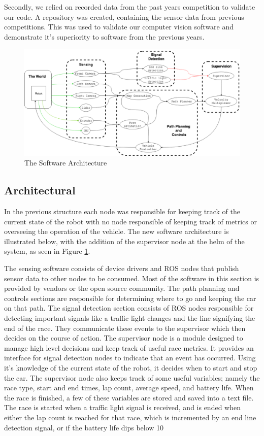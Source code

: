 \documentclass[11pt,journal]{IEEEtran}
\begin{document}
Secondly, we relied on recorded data from the past years competition to validate our code. A repository was created, containing the sensor data from previous competitions. This was used to validate our computer vision software and demonstrate it's superiority to software from the previous years.

\begin{figure}[ht]
\centerline{\includegraphics[width=2\columnwidth]{CodeStructure.png}}
\caption{The Software Architecture}
\label{Arch}
\end{figure}
\subsection{Architectural}
In the previous structure each node was responsible for keeping track of the current state of the robot with no node responsible of keeping track of metrics or overseeing the operation of the vehicle. The new software architecture is illustrated below, with the addition of the supervisor node at the helm of the system, as seen in Figure \ref{Arch}.

The sensing software consists of device drivers and ROS nodes that publish sensor data to other nodes to be consumed. Most of the software in this section is provided by vendors or the open source community.
The path planning and controls sections are responsible for determining where to go and keeping the car on that path.
The signal detection section consists of ROS nodes responsible for detecting important signals like a traffic light changes and the line signifying the end of the race. They communicate these events to the supervisor which then decides on the course of action.
The supervisor node is a module designed to manage high level decisions and keep track of useful race metrics. It provides an interface for signal detection nodes to indicate that an event has occurred. Using it's knowledge of the current state of the robot, it decides when to start and stop the car.
The supervisor node also keeps track of some useful variables; namely the race type, start and end times, lap count, average speed, and battery life. When the race is finished, a few of these variables are stored and saved into a text file. The race is started when a traffic light signal is received, and is ended when either the lap count is reached for that race, which is incremented by an end line detection signal, or if the battery life dips below 10%
\end{document}
